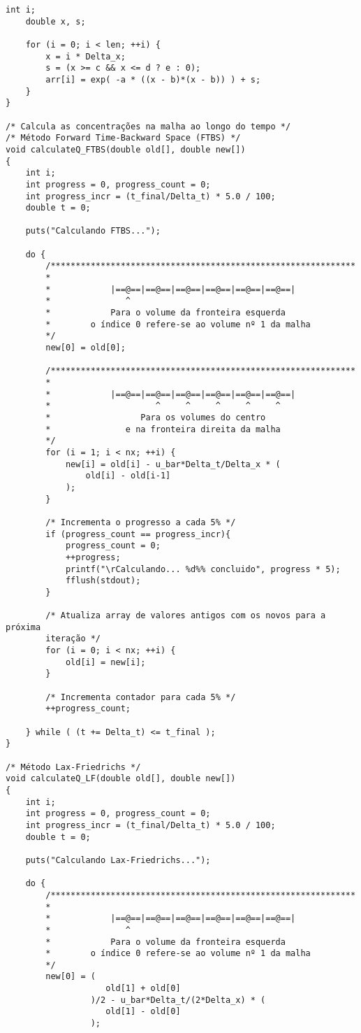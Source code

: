 \begin{Verbatim}[fontsize=\footnotesize]
    int i;
    double x, s;

    for (i = 0; i < len; ++i) {
        x = i * Delta_x;
        s = (x >= c && x <= d ? e : 0);
        arr[i] = exp( -a * ((x - b)*(x - b)) ) + s;
    }
}

/* Calcula as concentrações na malha ao longo do tempo */
/* Método Forward Time-Backward Space (FTBS) */
void calculateQ_FTBS(double old[], double new[])
{
    int i;
    int progress = 0, progress_count = 0;
    int progress_incr = (t_final/Delta_t) * 5.0 / 100;
    double t = 0;

    puts("Calculando FTBS...");

    do {
        /*************************************************************
        *
        *            |==@==|==@==|==@==|==@==|==@==|==@==|
        *               ^
        *            Para o volume da fronteira esquerda
        *        o índice 0 refere-se ao volume nº 1 da malha
        */
        new[0] = old[0];

        /*************************************************************
        *
        *            |==@==|==@==|==@==|==@==|==@==|==@==|
        *                     ^     ^     ^     ^     ^
        *                  Para os volumes do centro
        *               e na fronteira direita da malha
        */
        for (i = 1; i < nx; ++i) {
            new[i] = old[i] - u_bar*Delta_t/Delta_x * (
                old[i] - old[i-1]
            );
        }

        /* Incrementa o progresso a cada 5% */
        if (progress_count == progress_incr){
            progress_count = 0;
            ++progress;
            printf("\rCalculando... %d%% concluido", progress * 5);
            fflush(stdout);
        }

        /* Atualiza array de valores antigos com os novos para a próxima
        iteração */
        for (i = 0; i < nx; ++i) {
            old[i] = new[i];
        }

        /* Incrementa contador para cada 5% */
        ++progress_count;

    } while ( (t += Delta_t) <= t_final );
}

/* Método Lax-Friedrichs */
void calculateQ_LF(double old[], double new[])
{
    int i;
    int progress = 0, progress_count = 0;
    int progress_incr = (t_final/Delta_t) * 5.0 / 100;
    double t = 0;

    puts("Calculando Lax-Friedrichs...");

    do {
        /*************************************************************
        *
        *            |==@==|==@==|==@==|==@==|==@==|==@==|
        *               ^
        *            Para o volume da fronteira esquerda
        *        o índice 0 refere-se ao volume nº 1 da malha
        */
        new[0] = (
                    old[1] + old[0]
                 )/2 - u_bar*Delta_t/(2*Delta_x) * (
                    old[1] - old[0]
                 );


\end{Verbatim}
